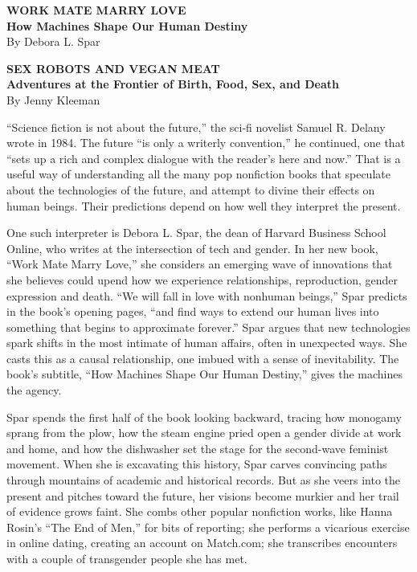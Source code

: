 \textbf{WORK MATE MARRY LOVE}\\
\textbf{How Machines Shape Our Human Destiny}\\
By Debora L. Spar

\textbf{SEX ROBOTS AND VEGAN MEAT}\\
\textbf{Adventures at the Frontier of Birth, Food, Sex, and Death}\\
By Jenny Kleeman

``Science fiction is not about the future,'' the sci-fi novelist Samuel
R. Delany wrote in 1984. The future ``is only a writerly convention,''
he continued, one that ``sets up a rich and complex dialogue with the
reader's here and now.'' That is a useful way of understanding all the
many pop nonfiction books that speculate about the technologies of the
future, and attempt to divine their effects on human beings. Their
predictions depend on how well they interpret the present.

One such interpreter is Debora L. Spar, the dean of Harvard Business
School Online, who writes at the intersection of tech and gender. In her
new book, ``Work Mate Marry Love,'' she considers an emerging wave of
innovations that she believes could upend how we experience
relationships, reproduction, gender expression and death. ``We will fall
in love with nonhuman beings,'' Spar predicts in the book's opening
pages, ``and find ways to extend our human lives into something that
begins to approximate forever.'' Spar argues that new technologies spark
shifts in the most intimate of human affairs, often in unexpected ways.
She casts this as a causal relationship, one imbued with a sense of
inevitability. The book's subtitle, ``How Machines Shape Our Human
Destiny,'' gives the machines the agency.

Spar spends the first half of the book looking backward, tracing how
monogamy sprang from the plow, how the steam engine pried open a gender
divide at work and home, and how the dishwasher set the stage for the
second-wave feminist movement. When she is excavating this history, Spar
carves convincing paths through mountains of academic and historical
records. But as she veers into the present and pitches toward the
future, her visions become murkier and her trail of evidence grows
faint. She combs other popular nonfiction works, like Hanna Rosin's
``The End of Men,'' for bits of reporting; she performs a vicarious
exercise in online dating, creating an account on Match.com; she
transcribes encounters with a couple of transgender people she has met.

